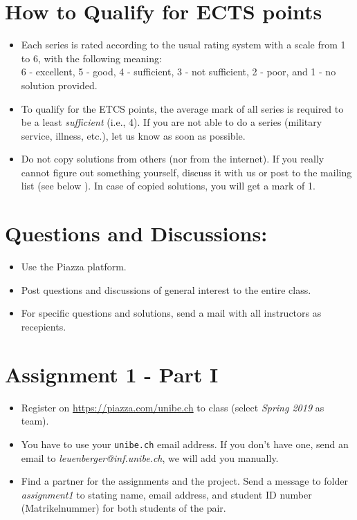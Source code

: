 \section{How to Qualify for ECTS points}

\begin{itemize}
\item Each series is rated according to the usual rating system with a scale from 1 to 6, with the following meaning:\\
  6 - excellent, 5 - good, 4 - sufficient, 3 - not sufficient, 2 - poor, and 1 - no solution provided.
\item To qualify for the ETCS points, the average mark of all series is required to be a least \emph{sufficient} (i.e., 4). If you are not able to do a series (military service, illness, etc.), let us know as soon as possible.
\item Do not copy solutions from others (nor from the internet). If you really cannot figure out something yourself, discuss it with us or post to the mailing list (see below ). In case of copied solutions, you will get a mark of 1.
\end{itemize}

\section{Questions and Discussions:}

\begin{itemize}
\item Use the Piazza platform.
\item Post questions and discussions of general interest to the entire class. 
\item For specific questions and solutions, send a mail with all instructors as recepients. 
\end{itemize}


\clearpage
\section{Assignment 1 - Part I}
\begin{itemize}
\item Register on \url{https://piazza.com/unibe.ch} to class  (select \emph{Spring 2019} as team). 
\item You have to use your \texttt{unibe.ch} email address. If you don't have one, send an email to \emph{leuenberger@inf.unibe.ch}, we will add you manually. 
\item Find a partner for the assignments and the project. Send a message to folder \emph{assignment1} to  stating name, email address, and student ID number (Matrikelnummer) for both students of the pair.
\end{itemize}


